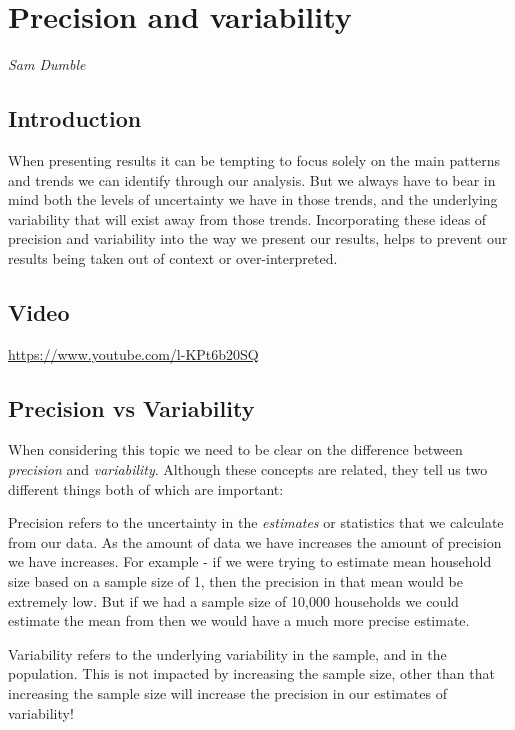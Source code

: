 \documentclass[
  titlepage]{book}
\begin{document}
\hypertarget{precision}{%
\chapter{Precision and variability}\label{precision}}

\emph{Sam Dumble}

\hypertarget{introduction-2}{%
\section{Introduction}\label{introduction-2}}

When presenting results it can be tempting to focus solely on the main patterns and trends we can identify through our analysis. But we always have to bear in mind both the levels of uncertainty we have in those trends, and the underlying variability that will exist away from those trends. Incorporating these ideas of precision and variability into the way we present our results, helps to prevent our results being taken out of context or over-interpreted.

\hypertarget{video-3}{%
\section{Video}\label{video-3}}

\label{fig:unnamed-chunk-26}\url{https://www.youtube.com/l-KPt6b20SQ}

\hypertarget{precision-vs-variability}{%
\section{Precision vs Variability}\label{precision-vs-variability}}

When considering this topic we need to be clear on the difference between \emph{precision} and \emph{variability}. Although these concepts are related, they tell us two different things both of which are important:

Precision refers to the uncertainty in the \emph{estimates} or statistics that we calculate from our data. As the amount of data we have increases the amount of precision we have increases. For example - if we were trying to estimate mean household size based on a sample size of 1, then the precision in that mean would be extremely low. But if we had a sample size of 10,000 households we could estimate the mean from then we would have a much more precise estimate.

Variability refers to the underlying variability in the sample, and in the population. This is not impacted by increasing the sample size, other than that increasing the sample size will increase the precision in our estimates of variability!
\end{document}
